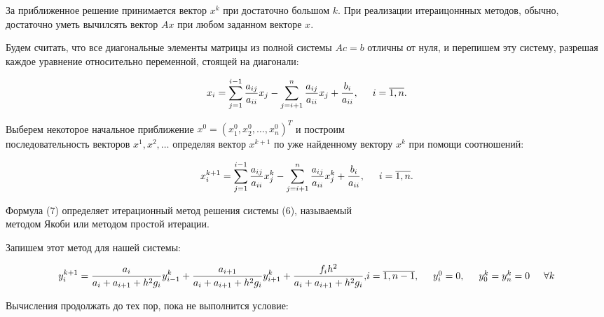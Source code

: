 \documentclass[a4paper,12pt]{article}
\begin{document}
За приближенное решение принимается вектор $x^k$ при достаточно большом $k$. При реализации итераицоннных методов,
обычно, достаточно уметь вычилсять вектор $Ax$ при любом заданном векторе $x$.

Будем считать, что все диагональные элементы матрицы из полной системы $Ac = b$ отличны от нуля, и перепишем
эту систему, разрешая каждое уравнение относительно переменной, стоящей на диагонали:

\begin{equation}
  x_i = \sum\limits_{j=1}^{i-1}\frac{a_{ij}}{a_{ii}} x_j - \sum\limits_{j = i+1}^{n}\frac{a_{ij}}{a_{ii}} x_j + \frac{b_i}{a_{ii}}, \hspace{0.5cm} i = \overline{1, n}.
\end{equation}

Выберем некоторое начальное приближение $x^0 = (x^0_1, x^0_2, \dots, x^0_n)^T$ и построим \\
последовательность векторов $x^1, x^2, \dots$ определяя вектор $x^{k+1}$ по уже найденному вектору $x^k$ при помощи соотношений:

\begin{equation}
  x^{k+1}_i = \sum\limits_{j=1}^{i-1}\frac{a_{ij}}{a_{ii}} x^k_j - \sum\limits_{j = i+1}^{n}\frac{a_{ij}}{a_{ii}} x^k_j + \frac{b_i}{a_{ii}}, \hspace{0.5cm} i = \overline{1, n}.
\end{equation}

Формула (7) определяет итерационный метод решения системы (6), называемый \\
методом Якоби или методом простой итерации.

Запишем этот метод для нашей системы:

\begin{equation}
    y^{k+1}_i = \frac{a_i}{a_i + a_{i+1} + h^2 g_i} y^k_{i-1} + \frac{a_{i + 1}}{a_i + a_{i+1} + h^2 g_i} y^k_{i+1} + \frac{f_i h^2}{a_i + a_{i+1} + h^2 g_i}, $$$$
    i = \overline{1, n - 1}, \hspace{0.5cm} y^0_i = 0, \hspace{0.5cm} y^k_0 = y^k_n = 0 \hspace{0.5cm} \forall k\\
\end{equation}

Вычисления продолжать до тех пор, пока не выполнится условие:
\end{document}
